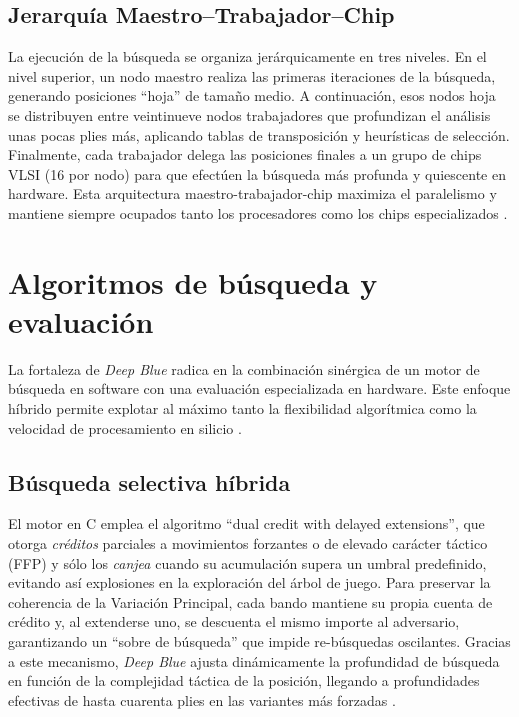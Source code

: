 \documentclass[a4paper, 12pt]{article}
\begin{document}
\subsection{Jerarquía Maestro--Trabajador--Chip}


La ejecución de la búsqueda se organiza jerárquicamente en tres 
niveles. En el nivel superior, un nodo maestro realiza las 
primeras iteraciones de la búsqueda, generando posiciones 
“hoja” de tamaño medio. A continuación, esos nodos hoja se 
distribuyen entre veintinueve nodos trabajadores que profundizan 
el análisis unas pocas plies más, aplicando tablas de 
transposición y heurísticas de selección. Finalmente, cada 
trabajador delega las posiciones finales a un grupo de chips 
VLSI (16 por nodo) para que efectúen la búsqueda más profunda y 
quiescente en hardware. Esta arquitectura maestro-trabajador-chip 
maximiza el paralelismo y mantiene siempre ocupados tanto los 
procesadores como los chips especializados \cite{campbell2002deep, hsu1999ibm}.










\section{Algoritmos de búsqueda y evaluación}

La fortaleza de \textit{Deep Blue} radica en la combinación 
sinérgica de un motor de búsqueda en software con una evaluación 
especializada en hardware. Este enfoque híbrido permite 
explotar al máximo tanto la flexibilidad algorítmica como la 
velocidad de procesamiento en silicio \cite{campbell1999search}.

\subsection{Búsqueda selectiva híbrida}

El motor en C emplea el algoritmo “dual credit with delayed 
extensions”, que otorga \emph{créditos} parciales a movimientos 
forzantes o de elevado carácter táctico (FFP) y sólo los 
\emph{canjea} cuando su acumulación supera un umbral predefinido, 
evitando así explosiones en la exploración del árbol de juego. 
Para preservar la coherencia de la 
Variación Principal, cada bando mantiene su propia cuenta de 
crédito y, al extenderse uno, se descuenta el mismo importe al 
adversario, garantizando un “sobre de búsqueda” que impide 
re-búsquedas oscilantes. Gracias a este 
mecanismo, \textit{Deep Blue} ajusta dinámicamente la 
profundidad de búsqueda en función de la complejidad táctica de 
la posición, llegando a profundidades efectivas de hasta 
cuarenta plies en las variantes más forzadas \cite{campbell1999search}.
\end{document}
